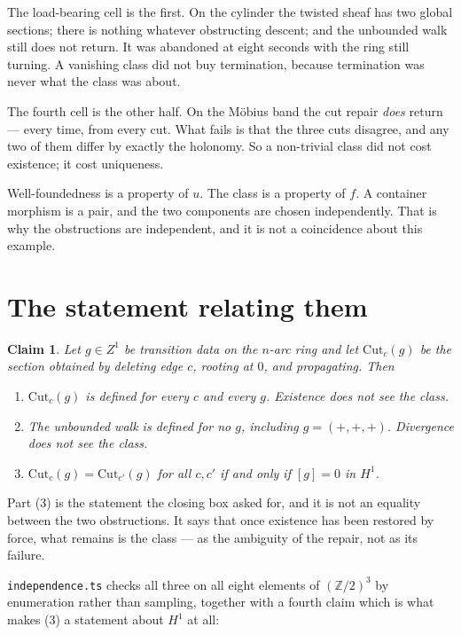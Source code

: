 \documentclass[11pt,a4paper]{article}
\newtheorem{claim}{Claim}
\begin{document}
The load-bearing cell is the first. On the cylinder the twisted sheaf has two global
sections; there is nothing whatever obstructing descent; and the unbounded walk still
does not return. It was abandoned at eight seconds with the ring still turning. A
vanishing class did not buy termination, because termination was never what the class
was about.

The fourth cell is the other half. On the M\"obius band the cut repair
\emph{does} return --- every time, from every cut. What fails is that the three cuts
disagree, and any two of them differ by exactly the holonomy. So a non-trivial class
did not cost existence; it cost uniqueness.

\begin{sectionbox}
Well-foundedness is a property of $u$. The class is a property of $f$.
A container morphism is a pair, and the two components are chosen independently.
That is why the obstructions are independent, and it is not a coincidence about
this example.
\end{sectionbox}

\section{The statement relating them}

\begin{claim}
Let $g \in Z^1$ be transition data on the $n$-arc ring and let $\mathrm{Cut}_c(g)$ be
the section obtained by deleting edge $c$, rooting at $0$, and propagating. Then
\begin{enumerate}
\item $\mathrm{Cut}_c(g)$ is defined for every $c$ and every $g$. Existence does not
      see the class.
\item The unbounded walk is defined for no $g$, including $g = (+,+,+)$. Divergence
      does not see the class.
\item $\mathrm{Cut}_{c}(g) = \mathrm{Cut}_{c'}(g)$ for all $c, c'$ if and only if
      $[g] = 0$ in $H^1$.
\end{enumerate}
\end{claim}

Part (3) is the statement the closing box asked for, and it is not an equality
between the two obstructions. It says that once existence has been restored by
force, what remains is the class --- as the ambiguity of the repair, not as its
failure.

\texttt{independence.ts} checks all three on all eight elements of $(\mathbb{Z}/2)^3$
by enumeration rather than sampling, together with a fourth claim which is what makes
(3) a statement about $H^1$ at all:
\end{document}
